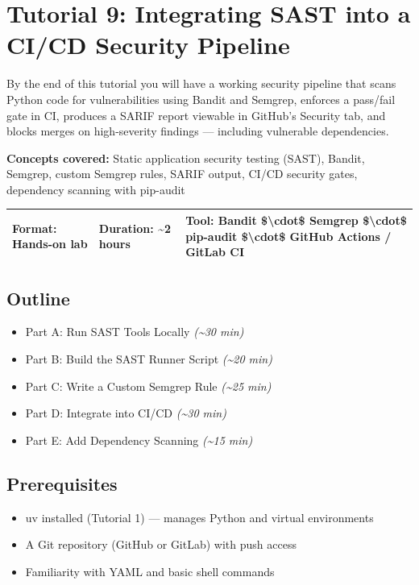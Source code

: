 \documentclass[11pt,a4paper]{book}
\begin{document}
\chapter{Tutorial 9: Integrating SAST into a CI/CD Security Pipeline}

By the end of this tutorial you will have a working security pipeline that scans Python code for vulnerabilities using Bandit and Semgrep, enforces a pass/fail gate in CI, produces a SARIF report viewable in GitHub's Security tab, and blocks merges on high-severity findings --- including vulnerable dependencies.

\textbf{Concepts covered:} Static application security testing (SAST), Bandit, Semgrep, custom Semgrep rules, SARIF output, CI/CD security gates, dependency scanning with pip-audit

\begin{tabular}{lll}
\hline
\textbf{Format:} Hands-on lab & \textbf{Duration:} \textasciitilde{}2 hours & \textbf{Tool:} Bandit \$\textbackslash{}cdot\$ Semgrep \$\textbackslash{}cdot\$ pip-audit \$\textbackslash{}cdot\$ GitHub Actions / GitLab CI \\
\hline
\end{tabular}

\medskip

\section{Outline}

\begin{itemize}
  \item Part A: Run SAST Tools Locally \textit{(\textasciitilde{}30 min)}
  \item Part B: Build the SAST Runner Script \textit{(\textasciitilde{}20 min)}
  \item Part C: Write a Custom Semgrep Rule \textit{(\textasciitilde{}25 min)}
  \item Part D: Integrate into CI/CD \textit{(\textasciitilde{}30 min)}
  \item Part E: Add Dependency Scanning \textit{(\textasciitilde{}15 min)}
\end{itemize}

\section{Prerequisites}

\begin{itemize}
  \item uv installed (Tutorial 1) --- manages Python and virtual environments
  \item A Git repository (GitHub or GitLab) with push access
  \item Familiarity with YAML and basic shell commands
\end{itemize}
\end{document}
